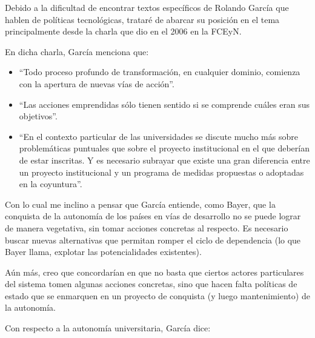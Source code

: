 Debido a la dificultad de encontrar textos específicos de Rolando García que hablen de políticas tecnológicas, trataré de abarcar su posición en el tema principalmente desde la charla que dio en el 2006 en la FCEyN.

En dicha charla, García menciona que:

\begin{itemize}
    \item ``Todo proceso profundo de transformación, en cualquier dominio, comienza con la apertura de nuevas vías de acción''.
    \item ``Las acciones emprendidas sólo tienen sentido si se comprende cuáles eran sus objetivos''.
    \item ``En el contexto particular de las universidades se discute mucho más sobre problemáticas puntuales que sobre el proyecto institucional en el que deberían de estar inscritas. Y es necesario subrayar que existe una gran diferencia entre un proyecto institucional y un programa de medidas propuestas o adoptadas en la coyuntura''.
\end{itemize}

Con lo cual me inclino a pensar que García entiende, como Bayer, que la conquista de la autonomía de los países en vías de desarrollo no se puede lograr de manera vegetativa, sin tomar acciones concretas al respecto. Es necesario buscar nuevas alternativas que permitan romper el ciclo de dependencia (lo que Bayer llama, explotar las potencialidades existentes).

Aún más, creo que concordarían en que no basta que ciertos actores particulares del sistema tomen algunas acciones concretas, sino que hacen falta políticas de estado que se enmarquen en un proyecto de conquista (y luego mantenimiento) de la autonomía.

Con respecto a la autonomía universitaria, García dice:

